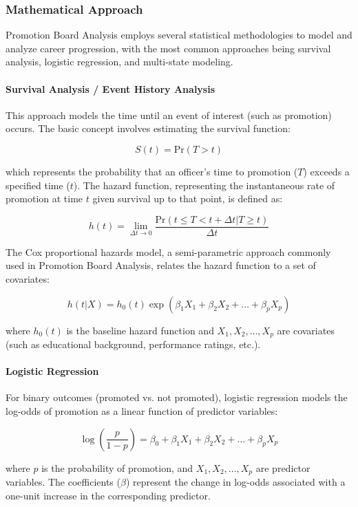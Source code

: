 \documentclass[../main.tex]{subfiles}
\begin{document}
\subsubsection{Mathematical Approach}

Promotion Board Analysis employs several statistical methodologies to model and analyze career progression, with the most common approaches being survival analysis, logistic regression, and multi-state modeling.

\paragraph{Survival Analysis / Event History Analysis}
This approach models the time until an event of interest (such as promotion) occurs. The basic concept involves estimating the survival function:

\[ S(t) = \text{Pr}(T > t) \]

which represents the probability that an officer's time to promotion (\(T\)) exceeds a specified time (\(t\)). The hazard function, representing the instantaneous rate of promotion at time \(t\) given survival up to that point, is defined as:

\[ h(t) = \lim_{\Delta t \to 0} \frac{\text{Pr}(t \leq T < t + \Delta t | T \geq t)}{\Delta t} \]

The Cox proportional hazards model, a semi-parametric approach commonly used in Promotion Board Analysis, relates the hazard function to a set of covariates:

\[ h(t|X) = h_0(t) \exp(\beta_1 X_1 + \beta_2 X_2 + \ldots + \beta_p X_p) \]

where \(h_0(t)\) is the baseline hazard function and \(X_1, X_2, \ldots, X_p\) are covariates (such as educational background, performance ratings, etc.).

\paragraph{Logistic Regression}
For binary outcomes (promoted vs. not promoted), logistic regression models the log-odds of promotion as a linear function of predictor variables:

\[ \log\left(\frac{p}{1-p}\right) = \beta_0 + \beta_1 X_1 + \beta_2 X_2 + \ldots + \beta_p X_p \]

where \(p\) is the probability of promotion, and \(X_1, X_2, \ldots, X_p\) are predictor variables. The coefficients (\(\beta\)) represent the change in log-odds associated with a one-unit increase in the corresponding predictor.
\end{document}
